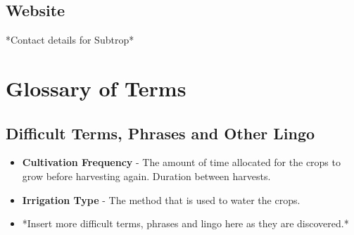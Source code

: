 \documentclass[11pt,fleqn]{book} %
\begin{document}
	\section{Website}
		*Contact details for Subtrop*



\chapter{Glossary of Terms}
	\section{Difficult Terms, Phrases and Other Lingo}
		\begin{itemize}
			\item \textbf{Cultivation Frequency} - The amount of time allocated for the crops to grow before harvesting again. Duration between harvests.
			\item \textbf{Irrigation Type} - The method that is used to water the crops.
			\item *Insert more difficult terms, phrases and lingo here as they are discovered.*
		\end{itemize}
\end{document}
